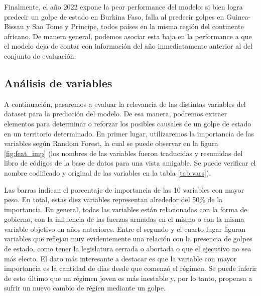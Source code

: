 \documentclass{article}
\begin{document}
Finalmente, el año 2022 expone la peor performance del modelo: si bien logra predecir
un golpe de estado en Burkina Faso, falla al predecir golpes en Guinea-Bissau y Sao Tome
y Principe, todos países en la misma región del continente africano. De manera general, 
podemos asociar esta baja en la performance a que el modelo deja de contar con
información del año inmediatamente anterior al del conjunto de evaluación.

\subsection{Análisis de variables}
A continuación, pasaremos a evaluar la relevancia de las distintas variables del dataset
para la predicción del modelo. De esa manera, podremos extraer elementos para determinar
o reforzar los posibles causales de un golpe de estado en un territorio determinado. En 
primer lugar, utilizaremos la importancia de las variables según Random Forest, la cual
se puede observar en la figura \ref{fig:feat_imp} (los nombres de las variables fueron
traducidas y resumidas del libro de códigos de la base de datos para una vista amigable.
Se puede verificar el nombre codificado y original de las variables en la tabla \ref{tab:vars}). 

Las barras indican el porcentaje de
importancia de las 10 variables con mayor peso. En total, estas diez variables representan
alrededor del 50\% de la importancia. En general, todas las variables están relacionadas 
con la forma de gobierno, con la influencia de las fuerzas armadas en el mismo o con la 
misma variable objetivo en años anteriores.
Entre el segundo y el cuarto lugar figuran variables
que reflejan muy evidentemente una relación con la presencia de golpes de estado, como 
tener la legislatura cerrada o abortada o que el ejecutivo no sea más electo. El dato más
interesante a destacar es que la variable con mayor importancia es la cantidad de días desde que
comenzó el régimen. Se puede inferir de esto último que un régimen joven es más inestable y, por
lo tanto, propensa a sufrir un nuevo cambio de régien mediante un golpe.
\end{document}
